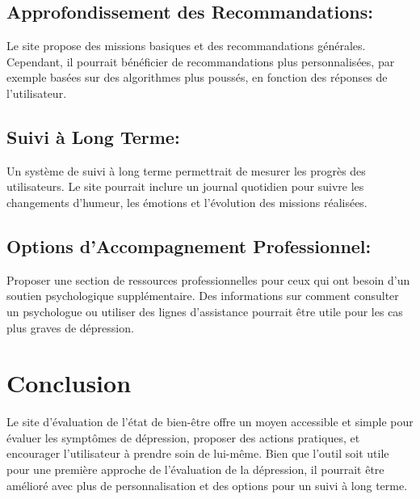 \documentclass[12pt, openany]{report}
\begin{document}
\subsection{\color{red}Approfondissement des Recommandations:}

Le site propose des missions basiques et des recommandations générales. Cependant, il pourrait bénéficier de recommandations plus personnalisées, par exemple basées sur des algorithmes plus poussés, en fonction des réponses de l’utilisateur.

\subsection{\color{red}Suivi à Long Terme:}

Un système de suivi à long terme permettrait de mesurer les progrès des utilisateurs. Le site pourrait inclure un journal quotidien pour suivre les changements d’humeur, les émotions et l’évolution des missions réalisées.

\subsection{\color{red}Options d'Accompagnement Professionnel:}

Proposer une section de ressources professionnelles pour ceux qui ont besoin d'un soutien psychologique supplémentaire. Des informations sur comment consulter un psychologue ou utiliser des lignes d’assistance pourrait être utile pour les cas plus graves de dépression.



\section{\color{red} Conclusion}

Le site d'évaluation de l'état de bien-être offre un moyen accessible et simple pour évaluer les symptômes de dépression, proposer des actions pratiques, et encourager l'utilisateur à prendre soin de lui-même. Bien que l'outil soit utile pour une première approche de l’évaluation de la dépression, il pourrait être amélioré avec plus de personnalisation et des options pour un suivi à long terme.
\end{document}
